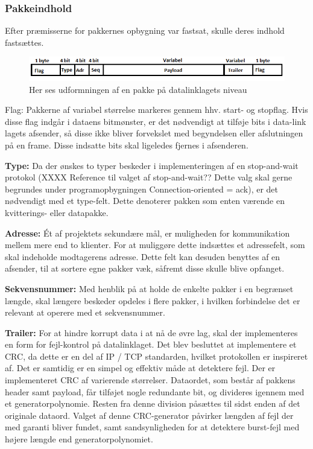 \subsubsection{Pakkeindhold}
Efter præmisserne for pakkernes opbygning var fastsat, skulle deres indhold fastsættes. 

\begin{figure}[h!]
\centering
\includegraphics[scale=0.8]{Billeder/DataLinkFrame.PNG}
\caption{Her ses udformningen af en pakke på datalinklagets niveau}
\label{fig:DataLinkFrame}
\end{figure}

Flag: Pakkerne af variabel størrelse markeres gennem hhv. start- og stopflag. Hvis disse flag indgår i dataens bitmønster, er det nødvendigt at tilføje bits i data-link lagets afsender, så disse ikke bliver forvekslet med begyndelsen eller afslutningen på en frame. Disse indsatte bits skal ligeledes fjernes i afsenderen. 

\textbf{Type:} Da der ønskes to typer beskeder i implementeringen af en stop-and-wait protokol (XXXX Reference til valget af stop-and-wait?? Dette valg skal gerne begrundes under programopbygningen Connection-oriented = ack), er det nødvendigt med et type-felt. Dette denoterer pakken som enten værende en kvitterings- eller datapakke.

\textbf{Adresse:} Ét af projektets sekundære mål, er muligheden for kommunikation mellem mere end to klienter. For at muliggøre dette indsættes et adressefelt, som skal indeholde modtagerens adresse. Dette felt kan desuden benyttes af en afsender, til at sortere egne pakker væk, såfremt disse skulle blive opfanget.

\textbf{Sekvensnummer:} Med henblik på at holde de enkelte pakker i en begrænset længde, skal længere beskeder opdeles i flere pakker, i hvilken forbindelse det er relevant at operere med et sekvensnummer.

\textbf{Trailer:} For at hindre korrupt data i at nå de øvre lag, skal der implementeres en form for fejl-kontrol på datalinklaget. Det blev besluttet at implementere et CRC, da dette er en del af IP / TCP standarden, hvilket protokollen er inspireret af. Det er samtidig er en simpel og effektiv måde at detektere fejl.
Der er implementeret CRC af varierende størrelser. Dataordet, som består af pakkens header samt payload, får tilføjet nogle redundante bit, og divideres igennem med et generatorpolynomie. Resten fra denne division påsættes til sidst enden af det originale dataord.	Valget af denne CRC-generator påvirker længden af fejl der med garanti bliver fundet, samt sandsynligheden for at detektere burst-fejl med højere længde end generatorpolynomiet.

